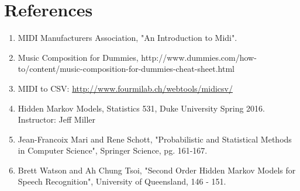 \documentclass{article} %
\begin{document}
\section{References}
\begin{enumerate}

\item MIDI Manufacturers Association, "An Introduction to Midi". 
\item Music Composition for Dummies, http://www.dummies.com/how-to/content/music-composition-for-dummies-cheat-sheet.html
\item MIDI to CSV: \url{http://www.fourmilab.ch/webtools/midicsv/}
\item Hidden Markov Models, Statistics 531, Duke University Spring 2016. Instructor: Jeff Miller
\item Jean-Francoix Mari and Rene Schott, "Probabilistic and Statistical Methods in Computer Science", Springer Science, pg. 161-167.  
\item Brett Watson and Ah Chung Tsoi, "Second Order Hidden Markov Models for Speech Recognition", University of Queensland, 146 - 151.
\end{enumerate}
\end{document}

